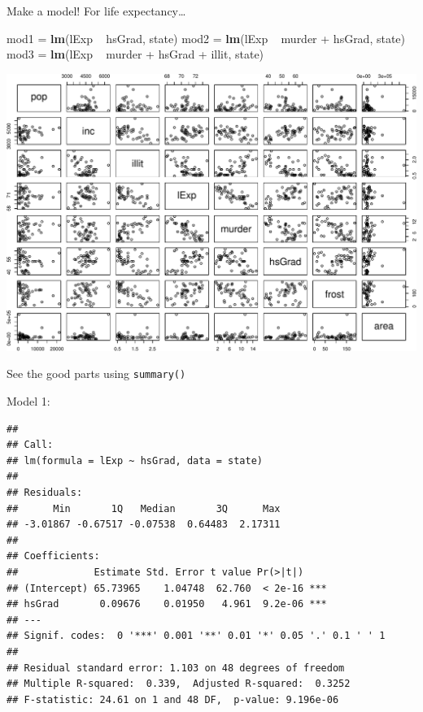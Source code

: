 \documentclass[ignorenonframetext,]{beamer}
\newenvironment{Shaded}{\begin{snugshade}}{\end{snugshade}}
\newcommand{\KeywordTok}[1]{\textcolor[rgb]{0.13,0.29,0.53}{\textbf{{#1}}}}
\newcommand{\StringTok}[1]{\textcolor[rgb]{0.31,0.60,0.02}{{#1}}}
\newcommand{\NormalTok}[1]{{#1}}
\begin{document}
\begin{frame}[fragile]{Make a model! For life expectancy\ldots{}}

\begin{Shaded}
\begin{Highlighting}[]
\NormalTok{mod1 =}\StringTok{ }\KeywordTok{lm}\NormalTok{(lExp ~}\StringTok{ }\NormalTok{hsGrad, state)}
\NormalTok{mod2 =}\StringTok{ }\KeywordTok{lm}\NormalTok{(lExp ~}\StringTok{ }\NormalTok{murder +}\StringTok{ }\NormalTok{hsGrad, state)}
\NormalTok{mod3 =}\StringTok{ }\KeywordTok{lm}\NormalTok{(lExp ~}\StringTok{ }\NormalTok{murder +}\StringTok{ }\NormalTok{hsGrad +}\StringTok{ }\NormalTok{illit, state)}
\end{Highlighting}
\end{Shaded}

\includegraphics{Regression_files/figure-beamer/unnamed-chunk-13-1.pdf}

\end{frame}

\begin{frame}{See the good parts using \texttt{summary()}}

\end{frame}

\begin{frame}[fragile]{Model 1:}

\begin{Verbatim}[fontsize=\small]
## 
## Call:
## lm(formula = lExp ~ hsGrad, data = state)
## 
## Residuals:
##      Min       1Q   Median       3Q      Max 
## -3.01867 -0.67517 -0.07538  0.64483  2.17311 
## 
## Coefficients:
##             Estimate Std. Error t value Pr(>|t|)    
## (Intercept) 65.73965    1.04748  62.760  < 2e-16 ***
## hsGrad       0.09676    0.01950   4.961  9.2e-06 ***
## ---
## Signif. codes:  0 '***' 0.001 '**' 0.01 '*' 0.05 '.' 0.1 ' ' 1
## 
## Residual standard error: 1.103 on 48 degrees of freedom
## Multiple R-squared:  0.339,  Adjusted R-squared:  0.3252 
## F-statistic: 24.61 on 1 and 48 DF,  p-value: 9.196e-06
\end{Verbatim}

\end{frame}
\end{document}
